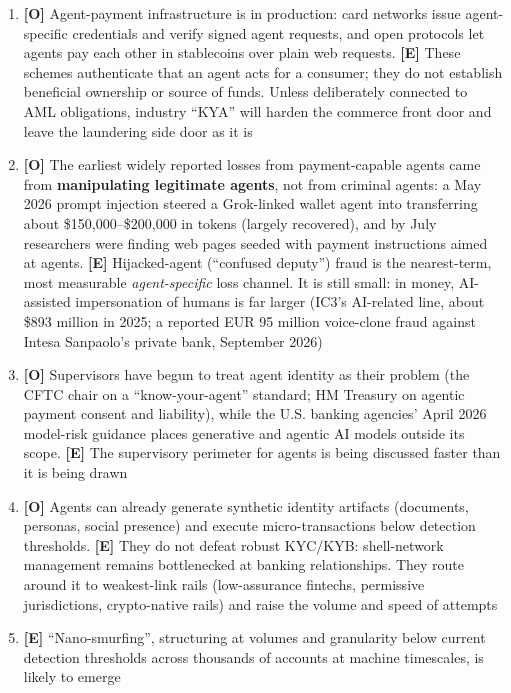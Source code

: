 \documentclass[11pt,letterpaper]{article}
\begin{document}
\vspace{0.15cm}

\begin{keybox}
\begin{enumerate}
  \item \textbf{[O]} Agent-payment infrastructure is in production: card networks issue agent-specific credentials and verify signed agent requests, and open protocols let agents pay each other in stablecoins over plain web requests. \textbf{[E]} These schemes authenticate that an agent acts for a consumer; they do not establish beneficial ownership or source of funds. Unless deliberately connected to AML obligations, industry ``KYA'' will harden the commerce front door and leave the laundering side door as it is
  \item \textbf{[O]} The earliest widely reported losses from payment-capable agents came from \textbf{manipulating legitimate agents}, not from criminal agents: a May 2026 prompt injection steered a Grok-linked wallet agent into transferring about \$150,000--\$200,000 in tokens (largely recovered), and by July researchers were finding web pages seeded with payment instructions aimed at agents. \textbf{[E]} Hijacked-agent (``confused deputy'') fraud is the nearest-term, most measurable \textit{agent-specific} loss channel. It is still small: in money, AI-assisted impersonation of humans is far larger (IC3's AI-related line, about \$893 million in 2025; a reported EUR 95 million voice-clone fraud against Intesa Sanpaolo's private bank, September 2026)
  \item \textbf{[O]} Supervisors have begun to treat agent identity as their problem (the CFTC chair on a ``know-your-agent'' standard; HM Treasury on agentic payment consent and liability), while the U.S. banking agencies' April 2026 model-risk guidance places generative and agentic AI models outside its scope. \textbf{[E]} The supervisory perimeter for agents is being discussed faster than it is being drawn
  \item \textbf{[O]} Agents can already generate synthetic identity artifacts (documents, personas, social presence) and execute micro-transactions below detection thresholds. \textbf{[E]} They do not defeat robust KYC/KYB: shell-network management remains bottlenecked at banking relationships. They route around it to weakest-link rails (low-assurance fintechs, permissive jurisdictions, crypto-native rails) and raise the volume and speed of attempts
  \item \textbf{[E]} ``Nano-smurfing'', structuring at volumes and granularity below current detection thresholds across thousands of accounts at machine timescales, is likely to emerge

\end{enumerate}
\end{keybox}
\end{document}
